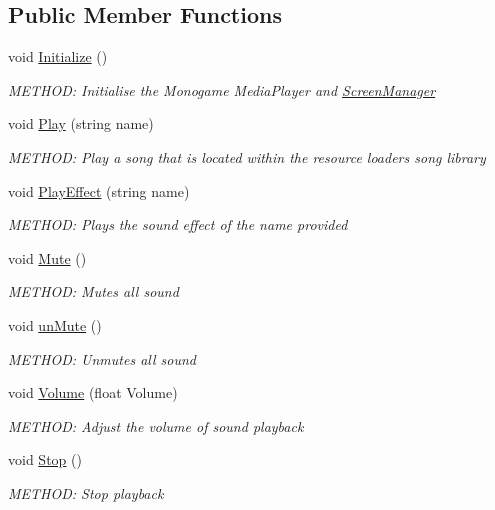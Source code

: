 \subsection*{Public Member Functions}
\begin{DoxyCompactItemize}
\item 
void \hyperlink{a00546_a06224065983b6fe162de98b8dcc944c2}{Initialize} ()
\begin{DoxyCompactList}\small\item\em M\+E\+T\+H\+OD\+: Initialise the Monogame Media\+Player and \hyperlink{a00538}{Screen\+Manager} \end{DoxyCompactList}\item 
void \hyperlink{a00546_aabfeb911d8bd573065e9c02d3f81e582}{Play} (string name)
\begin{DoxyCompactList}\small\item\em M\+E\+T\+H\+OD\+: Play a song that is located within the resource loaders song library \end{DoxyCompactList}\item 
void \hyperlink{a00546_a6613813ccd38703484e80ca8775ecdf8}{Play\+Effect} (string name)
\begin{DoxyCompactList}\small\item\em M\+E\+T\+H\+OD\+: Plays the sound effect of the name provided \end{DoxyCompactList}\item 
void \hyperlink{a00546_a5a3a9b96e6708deedf2c4939b3259011}{Mute} ()
\begin{DoxyCompactList}\small\item\em M\+E\+T\+H\+OD\+: Mutes all sound \end{DoxyCompactList}\item 
void \hyperlink{a00546_ad62eb34a308bfe457bc7229045a66af0}{un\+Mute} ()
\begin{DoxyCompactList}\small\item\em M\+E\+T\+H\+OD\+: Unmutes all sound \end{DoxyCompactList}\item 
void \hyperlink{a00546_ae1be3ecb76007fdc47843305df49604b}{Volume} (float Volume)
\begin{DoxyCompactList}\small\item\em M\+E\+T\+H\+OD\+: Adjust the volume of sound playback \end{DoxyCompactList}\item 
void \hyperlink{a00546_a0d3222475855f63b0c8f9dbe9b52e7f7}{Stop} ()
\begin{DoxyCompactList}\small\item\em M\+E\+T\+H\+OD\+: Stop playback \end{DoxyCompactList}\item 

\end{DoxyCompactItemize}

